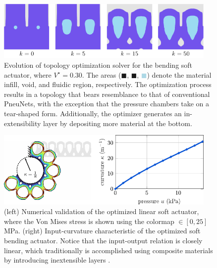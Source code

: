 \begin{figure}[!t]
\centering
\includegraphics*[width=0.95\textwidth]{./pdf/thesis-figure-3-2.pdf}
\caption{Evolution of topology optimization solver for the bending soft actuator, where $V^\star = 0.30$. The areas (\textcolor{matinfil}{$\blacksquare$}, \textcolor{lightvoid}{$\blacksquare$}, \textcolor{lightblue}{$\blacksquare$}) denote the material infill, void, and fluidic region, respectively. The optimization process results in a topology that bears resemblance to that of conventional PneuNets, with the exception that the pressure chambers take on a tear-shaped form. Additionally, the optimizer generates an in-extensibility layer by depositing more material at the bottom. }
\label{fig:topo_result}\end{figure}

\begin{figure}[!t]
  \centering
  \includegraphics*[width=0.95\textwidth]{./pdf/thesis-figure-3-5.pdf}
  \caption{(left) Numerical validation of the optimized linear soft actuator, where the Von Mises stress is shown using the colormap \protect{}$\!\!\in [0,25]$ \si{\mega \pascal}. (right) Input-curvature characteristic of the optimized soft bending actuator. Notice that the input-output relation is closely linear, which traditionally is accomplished using composite materials by introducing inextensible layers \cite{Polygerinos2013,Polygerinos2015}.}
  \label{fig:topo_result_bellow_fem}
\end{figure}

